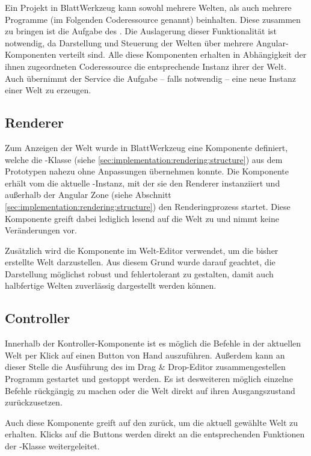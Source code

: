 Ein Projekt in BlattWerkzeug kann sowohl mehrere Welten, als auch mehrere Programme (im Folgenden Coderessource genannt) beinhalten. Diese zusammen zu bringen ist die Aufgabe des . Die Auslagerung dieser Funktionalität ist notwendig, da Darstellung und Steuerung der Welten über mehrere Angular-Komponenten verteilt sind. Alle diese Komponenten erhalten in Abhängigkeit der ihnen zugeordneten Coderessource die entsprechende Instanz ihrer der Welt. Auch übernimmt der Service die Aufgabe -- falls notwendig -- eine neue Instanz einer Welt zu erzeugen.

\subsection{Renderer}
\label{sec:implementation:integration:renderer}

Zum Anzeigen der Welt wurde in BlattWerkzeug eine Komponente definiert, welche die -Klasse (siehe \ref{sec:implementation:rendering:structure}) aus dem Prototypen nahezu ohne Anpassungen übernehmen konnte. Die Komponente erhält vom  die aktuelle -Instanz, mit der sie den Renderer instanziiert und außerhalb der Angular Zone (siehe Abschnitt \ref{sec:implementation:rendering:structure}) den Renderingprozess startet. Diese Komponente greift dabei lediglich lesend auf die Welt zu und nimmt keine Veränderungen vor.

Zusätzlich wird die Komponente im Welt-Editor verwendet, um die bisher erstellte Welt darzustellen. Aus diesem Grund wurde darauf geachtet, die Darstellung möglichst robust und fehlertolerant zu gestalten, damit auch halbfertige Welten zuverlässig dargestellt werden können.

\subsection{Controller}
\label{sec:implementation:integration:controller}

Innerhalb der Kontroller-Komponente ist es möglich die Befehle in der aktuellen Welt per Klick auf einen Button von Hand auszuführen. Außerdem kann an dieser Stelle die Ausführung des im Drag \& Drop-Editor zusammengestellen Programm gestartet und gestoppt werden. Es ist desweiteren möglich einzelne Befehle rückgängig zu machen oder die Welt direkt auf ihren Ausgangszustand zurückzusetzen.

Auch diese Komponente greift auf den  zurück, um die aktuell gewählte Welt zu erhalten. Klicks auf die Buttons werden direkt an die entsprechenden Funktionen der -Klasse weitergeleitet.

